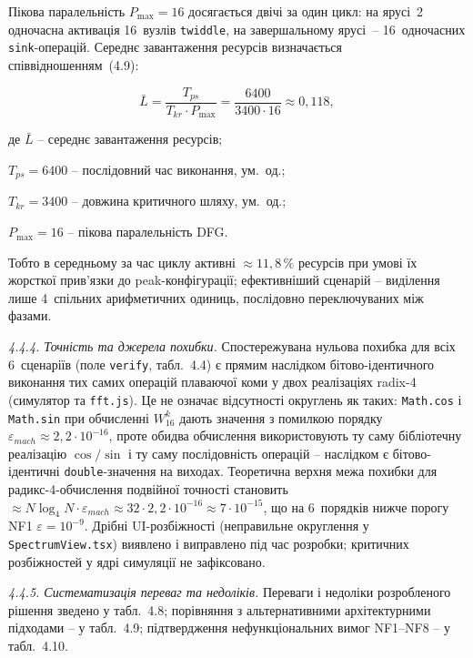 \documentclass[
]{article}
\begin{document}
Пікова паралельність \(P_{\max} = 16\) досягається двічі за один цикл:
на ярусі~2 одночасна активація 16~вузлів \texttt{twiddle}, на
завершальному ярусі~-- 16~одночасних \texttt{sink}-операцій. Середнє
завантаження ресурсів визначається співвідношенням~(4.9):

\begin{equation}
\tag{4.9}\label{eq:avg-load}
\bar{L} = \frac{T_{ps}}{T_{kr} \cdot P_{\max}}
= \frac{6400}{3400 \cdot 16} \approx 0{,}118,
\end{equation}

де \(\bar{L}\) -- середнє завантаження ресурсів;

\(T_{ps} = 6400\) -- послідовний час виконання, ум.~од.;

\(T_{kr} = 3400\) -- довжина критичного шляху, ум.~од.;

\(P_{\max} = 16\) -- пікова паралельність DFG.

Тобто в середньому за час циклу активні \(\approx 11{,}8\,\%\) ресурсів
при умові їх жорсткої прив'язки до peak-конфігурації; ефективніший
сценарій -- виділення лише 4~спільних арифметичних одиниць, послідовно
переключуваних між фазами.

\emph{4.4.4. Точність та джерела похибки.} Спостережувана нульова
похибка для всіх 6~сценаріїв (поле \texttt{verify}, табл.~4.4) є
прямим наслідком бітово-ідентичного виконання тих самих операцій
плаваючої коми у двох реалізаціях radix-4 (симулятор та \texttt{fft.js}).
Це не означає відсутності округлень як таких: \texttt{Math.cos} і
\texttt{Math.sin} при обчисленні \(W_{16}^{k}\) дають значення з
помилкою порядку \(\varepsilon_{mach} \approx 2{,}2 \cdot 10^{- 16}\),
проте обидва обчислення використовують ту саму бібліотечну реалізацію
\(\cos/\sin\) і ту саму послідовність операцій -- наслідком є
бітово-ідентичні \texttt{double}-значення на виходах. Теоретична верхня
межа похибки для радикс-4-обчислення подвійної точності становить
\(\approx N \log_{4} N \cdot \varepsilon_{mach} \approx 32 \cdot 2{,}2
\cdot 10^{- 16} \approx 7 \cdot 10^{- 15}\), що на 6~порядків нижче
порогу NF1 \(\varepsilon = 10^{- 9}\). Дрібні UI-розбіжності
(неправильне округлення у \texttt{SpectrumView.tsx}) виявлено і
виправлено під час розробки; критичних розбіжностей у ядрі симуляції не
зафіксовано.

\emph{4.4.5. Систематизація переваг та недоліків.} Переваги і недоліки
розробленого рішення зведено у табл.~4.8; порівняння з альтернативними
архітектурними підходами -- у табл.~4.9; підтвердження нефункціональних
вимог NF1--NF8 -- у табл.~4.10.
\end{document}
